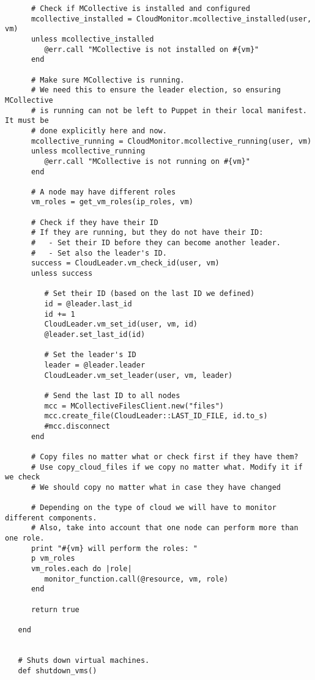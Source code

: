 \begin{lstlisting}
      # Check if MCollective is installed and configured
      mcollective_installed = CloudMonitor.mcollective_installed(user, vm)
      unless mcollective_installed
         @err.call "MCollective is not installed on #{vm}"
      end
      
      # Make sure MCollective is running.
      # We need this to ensure the leader election, so ensuring MCollective
      # is running can not be left to Puppet in their local manifest. It must be
      # done explicitly here and now.
      mcollective_running = CloudMonitor.mcollective_running(user, vm)
      unless mcollective_running
         @err.call "MCollective is not running on #{vm}"
      end
      
      # A node may have different roles
      vm_roles = get_vm_roles(ip_roles, vm)
      
      # Check if they have their ID
      # If they are running, but they do not have their ID:
      #   - Set their ID before they can become another leader.
      #   - Set also the leader's ID.
      success = CloudLeader.vm_check_id(user, vm)
      unless success
      
         # Set their ID (based on the last ID we defined)
         id = @leader.last_id
         id += 1
         CloudLeader.vm_set_id(user, vm, id)
         @leader.set_last_id(id)
         
         # Set the leader's ID
         leader = @leader.leader
         CloudLeader.vm_set_leader(user, vm, leader)
         
         # Send the last ID to all nodes
         mcc = MCollectiveFilesClient.new("files")
         mcc.create_file(CloudLeader::LAST_ID_FILE, id.to_s)
         #mcc.disconnect
      end
      
      # Copy files no matter what or check first if they have them?
      # Use copy_cloud_files if we copy no matter what. Modify it if we check
      # We should copy no matter what in case they have changed
      
      # Depending on the type of cloud we will have to monitor different components.
      # Also, take into account that one node can perform more than one role.
      print "#{vm} will perform the roles: "
      p vm_roles
      vm_roles.each do |role|
         monitor_function.call(@resource, vm, role)
      end
      
      return true
      
   end


   # Shuts down virtual machines.
   def shutdown_vms()


\end{lstlisting}
